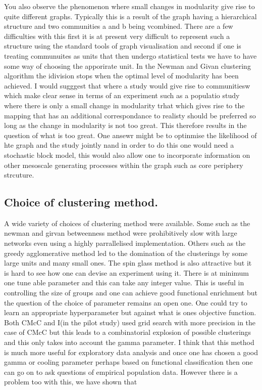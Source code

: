 You also observe the phenomenon where small changes in modularity give rise to quite different graphs. Typically this is a result of the graph having a hierarchical structure and two communities a and b being vcombined. There are a few difficulties with this first it is at present very difficult to represent such a structure using the standard tools of graph visualisation and second if one is treating communuites as units that then undergo statistical tests we have to have some way of choosing the apporirate unit. In the Newman and Givan clustering algorithm the idivision stops when the optimal level of modularity has been achieved. I would sugggest that where a study would give rise to communitiesw which make clear sense in terms of an experiment such as a populatio study where there is only a small change in modularity trhat which gives rise to the mapping that has an additional correspondance to realisty should be preferred so long as the change in modularity is not too great. This therefore results in the question of what is too great. One ansewr might be to optinmise the likelihood of hte graph and the study jointly nand in order to do this one would need a stochastic block model, this would also allow one to incorporate information on other mesoscale generating processes within the graph such as core periphery strcuture.






\subsection{Choice of clustering method.} 

A wide variety of choices of clustering method were available. Some such as the newman and girvan betweenness method were prohibitively slow with large networks even using a highly parrallelised implementation. Others such as the greedy agglomerative method led to the domination of the clusterings by some large units and many small ones. The spin glass method is also attractive but it is hard to see how one can devise an experiment using it. There is at minimum one tune able parameter and this can take any integer value. This is useful in controlling the size of groups and one can achieve good functional enrichment but the question of the choice of parameter remains an open one. One could try to learn an appropriate hyperparameter but against what is ones objective function. Both CMcC and I(in the pilot study) used grid search with more precision in the case of CMcC but this leads to a combinatorial explosion of possible clusterings and this only takes into account the gamma parameter. I think that this method is much more useful for exploratory data analysis and once one has chosen a good gamma or cooling parameter perhaps based on functional classification then one can go on to ask questions of empirical population data. However there is a problem too with this, we have shown that


